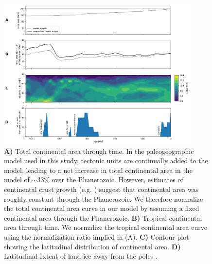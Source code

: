 \documentclass[11pt,letterpaper]{article}
\begin{document}
\begin{figure}[h!]
\begin{center}
	\includegraphics[width=0.9\textwidth]{Manuscript/Figures/Continent_Areas.pdf}
	\caption{\textbf{A)} Total continental area through time. In the paleogeographic model used in this study, tectonic units \citep{Torsvik2016a} are continually added to the model, leading to a net increase in total continental area in the model of $\sim$33\% over the Phanerozoic. However, estimates of continental crust growth (e.g. \citealp{Pujol2013a}) suggest that continental area was roughly constant through the Phanerozoic. We therefore normalize the total continental area curve in our model by assuming a fixed continental area through the Phanerozoic. \textbf{B)} Tropical continental area through time. We normalize the tropical continental area curve using the normalization ratio implied in (A). \textbf{C)} Contour plot showing the latitudinal distribution of continental area. \textbf{D)} Latitudinal extent of land ice away from the poles \citep{Macdonald2019a}.}
	\label{fig:Continent_Areas}
\end{center}
\end{figure}

\clearpage
\newpage
\footnotesize

\singlespacing



\end{document}
